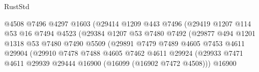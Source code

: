 \begin{lexlean}{RustStd}
\begin{coremodule}
                                      @4508
                                      @7496
                                      @4297
                                      @1603
                                      (@29414
                                        @1209
                                        @443
                                        @7496
                                        (@29419
                                          @1207
                                          @114
                                          @53
                                          @16
                                          @7494
                                          @4523
                                          (@29384
                                            @1207
                                            @53
                                            @7480
                                            @7492
                                            (@29877
                                              @494
                                              @1201
                                              @1318
                                              @53
                                              @7480
                                              @7490
                                              @5509
                                              (@29891
                                                @7479
                                                @7489
                                                @4605
                                                @7453
                                                @4611
                                                @29904
                                                (@29910
                                                  @7478
                                                  @7488
                                                  @4605
                                                  @7462
                                                  @4611
                                                  @29924
                                                  (@29933
                                                    @7471
                                                    @4611
                                                    @29939
                                                    @29444
                                                    @16900
                                                    (@16099 (@16902 @7472 @4508)))
                                                  @16900

\end{coremodule}
\end{lexlean}
